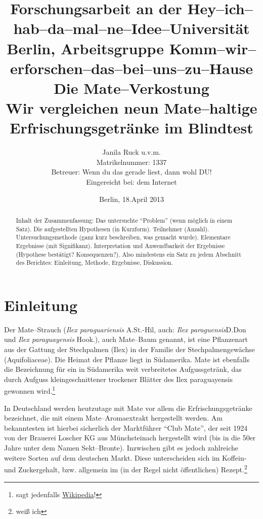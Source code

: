 \documentclass[11pt,a4paper,ngerman]{article}
\title{
{\normalsize Forschungsarbeit an der Hey--ich--hab--da--mal--ne--Idee--Universität\\
Berlin, Arbeitsgruppe Komm--wir--erforschen--das--bei--uns--zu--Hause}\\[6ex] 
\textbf{Die Mate--Verkostung}\\
\normalsize{Wir vergleichen neun Mate--haltige Erfrischungsgetränke im Blindtest}}
\author{Janila Ruck u.v.m.\\
{\normalsize Matrikelnummer: 1337}\\
{\normalsize Betreuer: Wenn du das gerade liest, dann wohl DU!}\\
{\normalsize Eingereicht bei: dem Internet}}
\date{Berlin, 18.April 2013}
\begin{document}
\begin{titlepage}
\maketitle
\thispagestyle{empty}

\vfill{}

\begin{abstract}
Inhalt der Zusammenfassung: Das untersuchte "`Problem"' (wenn möglich in einem Satz). Die aufgestellten Hypothesen (in Kurzform). Teilnehmer (Anzahl). Untersuchungsmethode (ganz kurz beschreiben, was gemacht wurde). Elementare Ergebnisse (mit Signifikanz). Interpretation und Anwendbarkeit der Ergebnisse (Hypothese bestätigt? Konsequenzen?). Also mindestens ein Satz zu jedem Abschnitt des Berichtes: Einleitung, Methode, Ergebnisse, Diskussion.
\end{abstract}
\end{titlepage}

\pagestyle{empty}
\clearpage{}


\tableofcontents

\clearpage{}
\pagestyle{fancy}
\setcounter{page}{1}
 


\section{Einleitung}\label{sec:einleitung}
Der Mate--Strauch (\textit{Ilex paraguariensis} A.St.-Hil, auch: \textit{Ilex paraguensis}\linebreak D.Don und \textit{Ilex paraguayensis} Hook.), auch Mate--Baum genannt, ist eine Pflanzenart aus der Gattung der Stechpalmen (Ilex) in der Familie der Stechpalmengewächse (Aquifoliaceae). Die Heimat der Pflanze liegt in Südamerika. Mate ist ebenfalls die Bezeichnung für ein in Südamerika weit verbreitetes Aufgussgetränk, das durch Aufguss kleingeschnittener trockener Blätter des Ilex paraguayensis gewonnen wird.\footnote{sagt jedenfalls \href{http://de.wikipedia.org/wiki/Mate}{Wikipedia}!}

In Deutschland werden heutzutage mit Mate vor allem die Erfrischungsgetränke bezeichnet, die mit einem Mate--Aromaextrakt hergestellt werden. Am bekanntesten ist hierbei sicherlich der Marktführer "`Club Mate"', der seit 1924 von der Brauerei Loscher KG aus Münchsteinach hergestellt wird (bis in die 50er Jahre unter dem Namen Sekt--Bronte). Inzwischen gibt es jedoch zahlreiche weitere Sorten auf dem deutschen Markt. Diese unterscheiden sich im Koffein- und Zuckergehalt, bzw. allgemein im (in der Regel nicht öffentlichen) Rezept.\footnote{weiß ich}
\end{document}

